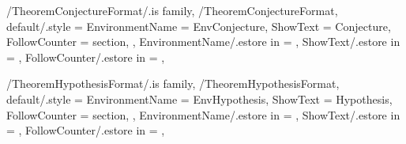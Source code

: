 \newcommand{\InsertProposition}[2][\empty]
{%
  \InsertTheoremContent[#1]{\GetTheoremPropositionFormatEnvironmentName}{#2}%
} %

\newcommand{\InitTheoremPropositionFormat}
{%
  \ifthenelse{\equal{\GetTheoremPropositionFormatFollowCounter}{\empty}}%
  {%
    \newtheorem{%
      \GetTheoremPropositionFormatEnvironmentName}{%
      \GetTheoremPropositionFormatShowText}%
  }%
  {%
    \newtheorem{%
      \GetTheoremPropositionFormatEnvironmentName}{%
      \GetTheoremPropositionFormatShowText}[%
      \GetTheoremPropositionFormatFollowCounter]%
  }%
} %


\pgfkeys
{
  /TheoremConjectureFormat/.is family, /TheoremConjectureFormat,
  default/.style =
  {
    EnvironmentName = {EnvConjecture},
    ShowText = {Conjecture},
    FollowCounter = section,
  },
  EnvironmentName/.estore in = \GetTheoremConjectureFormatEnvironmentName,
  ShowText/.estore in = \GetTheoremConjectureFormatShowText,
  FollowCounter/.estore in = \GetTheoremConjectureFormatFollowCounter,
} %

\newcommand{\InsertConjecture}[2][\empty]
{%
  \InsertTheoremContent[#1]{\GetTheoremConjectureFormatEnvironmentName}{#2}%
} %

\newcommand{\InitTheoremConjectureFormat}
{%
  \ifthenelse{\equal{\GetTheoremConjectureFormatFollowCounter}{\empty}}%
  {%
    \newtheorem{%
      \GetTheoremConjectureFormatEnvironmentName}{%
      \GetTheoremConjectureFormatShowText}%
  }%
  {%
    \newtheorem{%
      \GetTheoremConjectureFormatEnvironmentName}{%
      \GetTheoremConjectureFormatShowText}[%
      \GetTheoremConjectureFormatFollowCounter]%
  }%
} %


\pgfkeys
{
  /TheoremHypothesisFormat/.is family, /TheoremHypothesisFormat,
  default/.style =
  {
    EnvironmentName = {EnvHypothesis},
    ShowText = {Hypothesis},
    FollowCounter = section,
  },
  EnvironmentName/.estore in = \GetTheoremHypothesisFormatEnvironmentName,
  ShowText/.estore in = \GetTheoremHypothesisFormatShowText,
  FollowCounter/.estore in = \GetTheoremHypothesisFormatFollowCounter,
} %

\newcommand{\InsertHypothesis}[2][\empty]
{%
  \InsertTheoremContent[#1]{\GetTheoremHypothesisFormatEnvironmentName}{#2}%
} %


